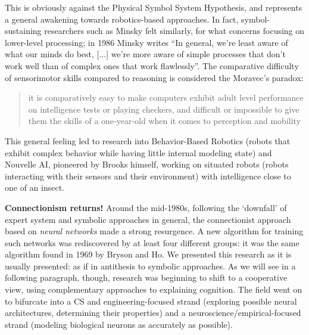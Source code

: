 \documentclass[../main.tex]{subfiles}
\begin{document}
This is obviously against the Physical Symbol System Hypothesis, and represents a general awakening towards robotics-based approaches. In fact, symbol-sustaining researchers such as Minsky felt similarly, for what concerns focusing on lower-level processing; in 1986 Minsky writes \enquote{In general, we're least aware of what our minds do best, [...] we're more aware of simple processes that don't work well than of complex ones that work flawlessly}\cite{minskySocietyMind1986}. The comparative difficulty of sensorimotor skills compared to reasoning is considered the Moravec's paradox:
\begin{quote}
    it is comparatively easy to make computers exhibit adult level performance on intelligence tests or playing checkers, and difficult or impossible to give them the skills of a one-year-old when it comes to perception and mobility
\end{quote}\cite{moravecMindChildrenFuture1988}
This general feeling led to research into Behavior-Based Robotics (robots that exhibit complex behavior while having little internal modeling state) and Nouvelle AI, pioneered by Brooks himself, working on situated robots (robots interacting with their sensors and their environment) with intelligence close to one of an insect.

\vspace{4pt}
\textbf{Connectionism returns!} Around the mid-1980s, following the `downfall' of expert system and symbolic approaches in general, the connectionist approach based on \textit{neural networks} made a strong resurgence. A new algorithm for training such networks was rediscovered by at least four different groups\cite{russellArtificialIntelligenceModern2002}: it was the same algorithm found in 1969 by Bryson and Ho. We presented this research as it is usually presented: as if in antithesis to symbolic approaches. As we will see in a following paragraph, though, research was beginning to shift to a cooperative view, using complementary approaches to explaining cognition. The field went on to bifurcate into a CS and engineering-focused strand (exploring possible neural architectures, determining their properties) and a neuroscience/empirical-focused strand (modeling biological neurons as accurately as possible).
\end{document}
